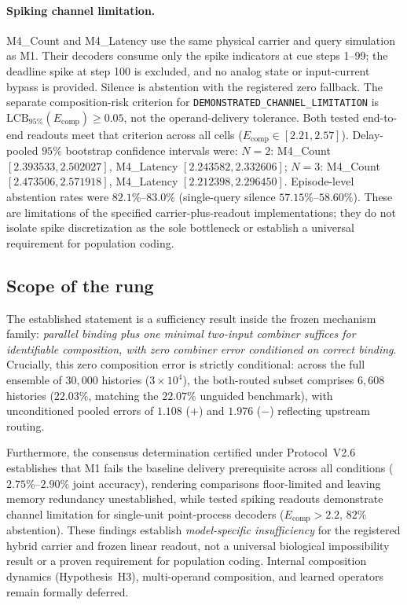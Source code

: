 \paragraph{Spiking channel limitation.}
M4\_Count and M4\_Latency use the same physical carrier and query simulation
as M1. Their decoders consume only the spike indicators at cue steps
1--99; the deadline spike at step 100 is excluded, and no analog state
or input-current bypass is provided. Silence is abstention with the
registered zero fallback. The separate composition-risk criterion for
\texttt{DEMONSTRATED\_CHANNEL\_LIMITATION} is
$\mathrm{LCB}_{95\%}(E_{\mathrm{comp}})\ge0.05$, not the operand-delivery
tolerance. Both tested end-to-end readouts meet that criterion across
all cells ($E_{\mathrm{comp}}\in[2.21,2.57]$).
Delay-pooled $95\%$ bootstrap confidence intervals were:
$N=2$: M4\_Count $[2.393533,2.502027]$, M4\_Latency $[2.243582,2.332606]$;
$N=3$: M4\_Count $[2.473506,2.571918]$, M4\_Latency $[2.212398,2.296450]$.
Episode-level abstention rates were $82.1\%$--$83.0\%$
(single-query silence $57.15\%$--$58.60\%$).
These are limitations of the specified carrier-plus-readout implementations;
they do not isolate spike discretization as the sole bottleneck or establish
a universal requirement for population coding.

\subsection{Scope of the rung}
\label{sec:scope8}

The established statement is a sufficiency result inside the frozen mechanism family: \emph{parallel binding plus one minimal two-input combiner suffices for identifiable composition, with zero combiner error conditioned on correct binding}. Crucially, this zero composition error is strictly conditional: across the full ensemble of $30{,}000$ histories ($3\times10^4$), the both-routed subset comprises $6{,}608$ histories ($22.03\%$, matching the $22.07\%$ unguided benchmark), with unconditioned pooled errors of $1.108$ ($+$) and $1.976$ ($-$) reflecting upstream routing.

Furthermore, the consensus determination certified under Protocol~V2.6 establishes that M1 fails the baseline delivery prerequisite across all conditions ($2.75\%$--$2.90\%$ joint accuracy), rendering comparisons floor-limited and leaving memory redundancy unestablished, while tested spiking readouts demonstrate channel limitation for single-unit point-process decoders ($E_{\text{comp}} > 2.2$, $82\%$ abstention). These findings establish \emph{model-specific insufficiency} for the registered hybrid carrier and frozen linear readout, not a universal biological impossibility result or a proven requirement for population coding. Internal composition dynamics (Hypothesis~H3), multi-operand composition, and learned operators remain formally deferred.

